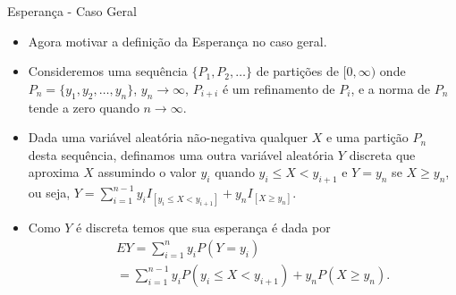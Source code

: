 %
%
%
%

%
%
\begin{frame}
\begin{block}{Esperança - Caso Geral}
%
\begin{itemize}
\item Agora motivar a definição da Esperança no caso geral. 
\item Consideremos uma sequência $\{P_1,P_2,\ldots\}$ de partições de $[0,\infty)$ onde $P_n=\{y_1,y_2,\ldots,y_n\}$, $y_n\rightarrow\infty$,  $P_{i+i}$ é um refinamento de $P_i$, e a norma de $P_n$ tende a zero quando $n\rightarrow\infty$.

\item Dada uma variável aleatória não-negativa qualquer $X$ e uma partição $P_n$ desta sequência, definamos uma outra variável aleatória $Y$ discreta que aproxima $X$ assumindo o valor $y_{i}$ quando $y_{i}\leq X<y_{i+1}$ e $Y=y_n$ se $X\geq y_n$, ou seja, $Y=\sum_{i=1}^{n-1}y_{i} I_{[y_{i}\leq X<y_{i+1}]}+y_nI_{[X\geq y_n]}$. 

\item Como $Y$ é discreta temos que sua esperança é dada por
\begin{eqnarray}
& & EY=\sum_{i=1}^{n} y_{i}P(Y=y_{i}) \nonumber\\
& & =\sum_{i=1}^{n-1} y_{i}P(y_{i}\leq X<y_{i+1})+y_nP(X\geq y_n).\nonumber
\end{eqnarray}
\end{itemize}
\end{block}
\end{frame}
%
